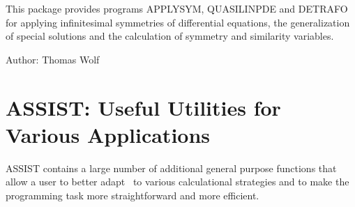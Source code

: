 This package provides programs APPLYSYM, QUASILINPDE and DETRAFO for
applying infinitesimal symmetries of differential equations, the
generalization of special solutions and the calculation of symmetry and
similarity variables.

Author: Thomas Wolf



\iffalse
\newpage

\section{ARNUM: An Algebraic Number Package}
\label{sec:package-arnum}
\indexpackage{ARNUM}


This package provides facilities for handling algebraic numbers as
polynomial coefficients in {\REDUCE} calculations. It includes facilities for
introducing indeterminates to represent algebraic numbers, for calculating
splitting fields, and for factoring and finding greatest common divisors
in such domains.

Author: Eberhard Schr\"ufer


\fi

\iffalse
\newpage

\section{ASSERT: Dynamic Verification of Assertions on Function Types}
\indexpackage{ASSERT}
\label{ASSERT}

ASSERT admits to add to symbolic mode RLISP code assertions (partly)
specifying \emph{types} of the arguments and results of RLISP expr
procedures. These types can be associated with functions testing the
validity of the respective arguments during runtime.

Author: Thomas Sturm



\fi

\newpage

\section{ASSIST: Useful Utilities for Various Applications}
\label{ASSIST}\hypertarget{ASSIST}{}

ASSIST contains a large number of additional general purpose functions
that allow a user to better adapt \REDUCE\ to various calculational
strategies and to make the programming task more straightforward and more
efficient.

